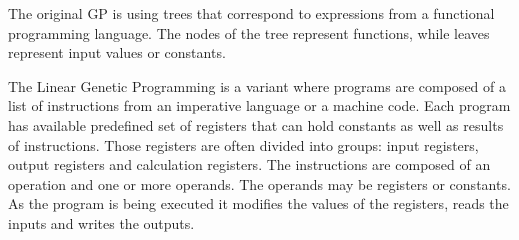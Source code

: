 \documentclass{ExcelAtFIT}
\begin{document}
The original GP is using trees that correspond to expressions from a functional programming language.
The nodes of the tree represent functions, while leaves represent input values or constants.

The Linear Genetic Programming is a variant where programs are composed of a list of instructions from an imperative language or a machine code.
Each program has available predefined set of registers that can hold constants as well as results of instructions.
Those registers are often divided into groups: input registers, output registers and calculation registers.
The instructions are composed of an operation and one or more operands.
The operands may be registers or constants.
As the program is being executed it modifies the values of the registers, reads the inputs and writes the outputs.

\end{document}
